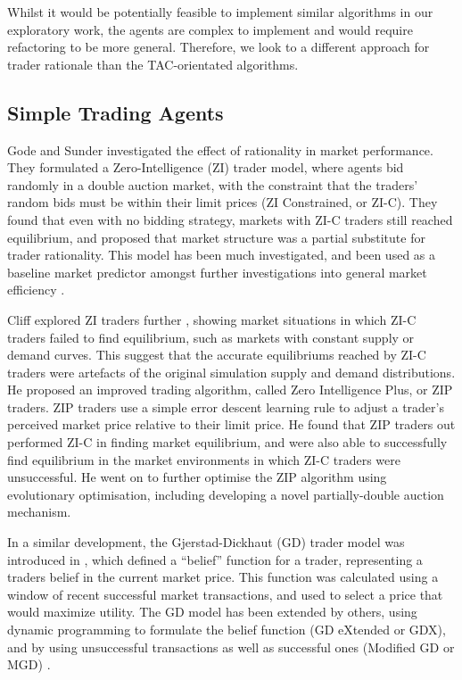 Whilst it would be potentially feasible to implement similar algorithms in our
exploratory work, the agents are complex to implement and would require
refactoring to be more general. Therefore, we look to a different approach for
trader rationale than the TAC-orientated algorithms.

\subsection{Simple Trading Agents}
\label{SEC:ECON:ZI}

Gode and Sunder\cite{eco-gode93-zi} investigated the effect of rationality in
market performance. They formulated a Zero-Intelligence (ZI) trader model,
where agents bid randomly in a double auction market, with the constraint that
the traders' random bids must be within their limit prices (ZI Constrained, or
ZI-C). They found that even with no bidding strategy, markets with ZI-C traders
still reached equilibrium, and proposed that market structure was a partial
substitute for trader rationality. This model has been much investigated, and
been used as a baseline market predictor \cite{eco-farmer05-predictive} amongst
further investigations into general market efficiency
\cite{eco-gode97-efficiency}.

Cliff explored ZI traders further \cite{eco-cliff97-minimal},
\cite{eco-cliff97-zip} showing market situations in which ZI-C traders failed
to find equilibrium, such as markets with constant supply or demand curves.
This suggest that the accurate equilibriums reached by ZI-C traders were
artefacts of the original simulation supply and demand distributions. He
proposed an improved trading algorithm, called Zero Intelligence Plus, or ZIP
traders. ZIP traders use a simple error descent learning rule to adjust a
trader's perceived market price relative to their limit price. He found that
ZIP traders out performed ZI-C in finding market equilibrium, and were also
able to successfully find equilibrium in the market environments in which ZI-C
traders were unsuccessful. He went on to further optimise the ZIP algorithm
\cite{eco-cliff01-evolution} using evolutionary optimisation, including
developing a novel partially-double auction mechanism. 

In a similar development, the Gjerstad-Dickhaut (GD) trader model was
introduced in \cite{eco-gjerstad98-gd}, which defined a ``belief'' function for
a trader, representing a traders belief in the current market price.   This
function was calculated using a window of recent successful market
transactions, and used to select a price that would maximize utility. The GD
model has been extended by others, using dynamic programming to formulate the
belief function (GD eXtended or GDX)\cite{eco-tesauro02-gdx}, and by using
unsuccessful transactions as well as successful ones (Modified GD or MGD)
\cite{eco-tesauro01-mgd}. 

